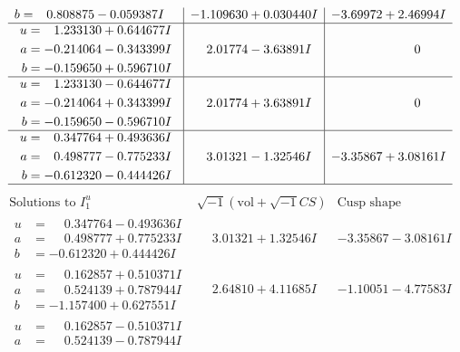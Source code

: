 \documentclass[1p]{elsarticle_modified}
\theoremstyle{definition}
\newcommand{\I}{\sqrt{-1}}
\begin{document}
$$\begin{array}{c|c|c}
\begin{aligned}
b &= \phantom{-}0.808875 - 0.059387 I\end{aligned}
 & -1.109630 + 0.030440 I & -3.69972 + 2.46994 I \\ \hline\begin{aligned}
u &= \phantom{-}1.233130 + 0.644677 I \\
a &= -0.214064 - 0.343399 I \\
b &= -0.159650 + 0.596710 I\end{aligned}
 & \phantom{-}2.01774 - 3.63891 I & \phantom{-0.000000 } 0 \\ \hline\begin{aligned}
u &= \phantom{-}1.233130 - 0.644677 I \\
a &= -0.214064 + 0.343399 I \\
b &= -0.159650 - 0.596710 I\end{aligned}
 & \phantom{-}2.01774 + 3.63891 I & \phantom{-0.000000 } 0 \\ \hline\begin{aligned}
u &= \phantom{-}0.347764 + 0.493636 I \\
a &= \phantom{-}0.498777 - 0.775233 I \\
b &= -0.612320 - 0.444426 I\end{aligned}
 & \phantom{-}3.01321 - 1.32546 I & -3.35867 + 3.08161 I\\
 \hline 
 \end{array}$$\newpage$$\begin{array}{c|c|c}  
\text{Solutions to }I^u_{1}& \I (\text{vol} + \sqrt{-1}CS) & \text{Cusp shape}\\
 \hline 
\begin{aligned}
u &= \phantom{-}0.347764 - 0.493636 I \\
a &= \phantom{-}0.498777 + 0.775233 I \\
b &= -0.612320 + 0.444426 I\end{aligned}
 & \phantom{-}3.01321 + 1.32546 I & -3.35867 - 3.08161 I \\ \hline\begin{aligned}
u &= \phantom{-}0.162857 + 0.510371 I \\
a &= \phantom{-}0.524139 + 0.787944 I \\
b &= -1.157400 + 0.627551 I\end{aligned}
 & \phantom{-}2.64810 + 4.11685 I & -1.10051 - 4.77583 I \\ \hline\begin{aligned}
u &= \phantom{-}0.162857 - 0.510371 I \\
a &= \phantom{-}0.524139 - 0.787944 I \\

\end{aligned}
\end{array}$$
\end{document}
